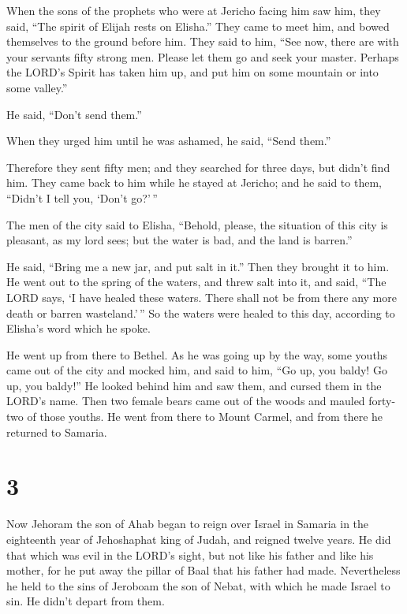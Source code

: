  When the sons of the prophets who were at Jericho facing
him saw him, they said, ``The spirit of Elijah rests on Elisha.'' They
came to meet him, and bowed themselves to the ground before him.
 They said to him, ``See now, there are with your
servants fifty strong men. Please let them go and seek your master.
Perhaps the LORD's Spirit has taken him up, and put him on some mountain
or into some valley.''

He said, ``Don't send them.''

 When they urged him until he was ashamed, he said,
``Send them.''

Therefore they sent fifty men; and they searched for three days, but
didn't find him.  They came back to him while he stayed
at Jericho; and he said to them, ``Didn't I tell you, `Don't go?'\,''

 The men of the city said to Elisha, ``Behold, please,
the situation of this city is pleasant, as my lord sees; but the water
is bad, and the land is barren.''

 He said, ``Bring me a new jar, and put salt in it.''
Then they brought it to him.  He went out to the spring
of the waters, and threw salt into it, and said, ``The LORD says, `I
have healed these waters. There shall not be from there any more death
or barren wasteland.'\,''  So the waters were healed to
this day, according to Elisha's word which he spoke.

 He went up from there to Bethel. As he was going up by
the way, some youths came out of the city and mocked him, and said to
him, ``Go up, you baldy! Go up, you baldy!''  He looked
behind him and saw them, and cursed them in the LORD's name. Then two
female bears came out of the woods and mauled forty-two of those youths.
 He went from there to Mount Carmel, and from there he
returned to Samaria.

\hypertarget{section-2}{%
\section{3}\label{section-2}}

 Now Jehoram the son of Ahab began to reign over Israel in
Samaria in the eighteenth year of Jehoshaphat king of Judah, and reigned
twelve years.  He did that which was evil in the LORD's
sight, but not like his father and like his mother, for he put away the
pillar of Baal that his father had made.  Nevertheless he
held to the sins of Jeroboam the son of Nebat, with which he made Israel
to sin. He didn't depart from them.

